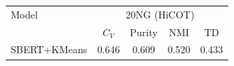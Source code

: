 \begin{tabular}{lcccc}
\toprule
Model & \multicolumn{4}{c}{20NG (HiCOT)} \\
 & $C_V$ & Purity & NMI & TD \\
\midrule
SBERT+KMeans & 0.646 & 0.609 & 0.520 & 0.433 \\
\bottomrule
\end{tabular}
